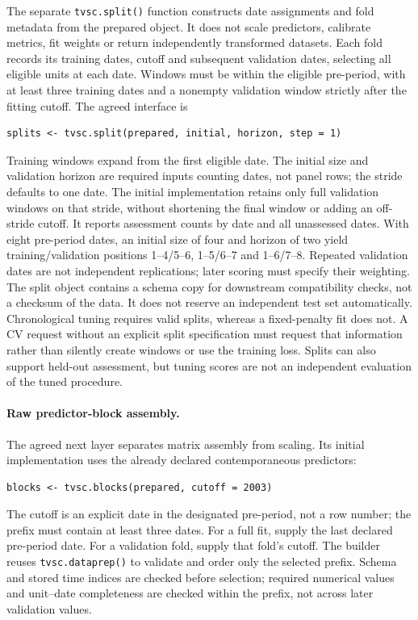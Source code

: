\documentclass[11pt]{article}
\begin{document}
The separate \texttt{tvsc.split()} function constructs date assignments
and fold metadata from the prepared object. It does not scale predictors,
calibrate metrics, fit weights or return independently transformed datasets.
Each fold records its training dates, cutoff and subsequent validation
dates, selecting all eligible units at each date. Windows must be within
the eligible pre-period, with at least three training dates and a nonempty
validation window strictly after the fitting cutoff. The agreed interface is
\begin{verbatim}
splits <- tvsc.split(prepared, initial, horizon, step = 1)
\end{verbatim}
Training windows expand from the first eligible date. The initial size and
validation horizon are required inputs counting dates, not panel rows;
the stride defaults to one date. The initial implementation retains only
full validation windows on that stride, without shortening the final window
or adding an off-stride cutoff. It reports assessment counts by date and
all unassessed dates. With eight pre-period dates, an initial size of four
and horizon of two yield training/validation positions 1--4/5--6,
1--5/6--7 and 1--6/7--8. Repeated validation dates are not independent
replications; later scoring must specify their weighting. The split object
contains a schema copy for downstream compatibility checks, not a checksum
of the data. It does not reserve an independent test set automatically.
Chronological tuning requires valid splits, whereas a fixed-penalty fit
does not. A CV request without an explicit split specification must request that
information rather than silently create windows or use the training loss.
Splits can also support held-out assessment, but tuning scores are not an
independent evaluation of the tuned procedure.

\paragraph{Raw predictor-block assembly.}
The agreed next layer separates matrix assembly from scaling. Its initial
implementation uses the already declared contemporaneous predictors:
\begin{verbatim}
blocks <- tvsc.blocks(prepared, cutoff = 2003)
\end{verbatim}
The cutoff is an explicit date in the designated pre-period, not a row
number; the prefix must contain at least three dates. For a full fit, supply
the last declared pre-period date. For a validation fold, supply that fold's
cutoff. The builder reuses \texttt{tvsc.dataprep()} to validate and order
only the selected prefix. Schema and stored time indices are checked before
selection; required numerical values and unit--date completeness are checked
within the prefix, not across later validation values.
\end{document}
